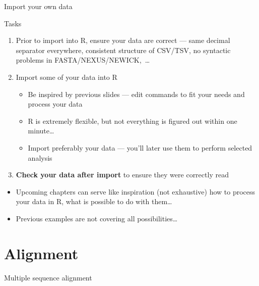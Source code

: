 \documentclass[compress, ucs, xelatex, 11pt, xcolor=svgnames, aspectratio=169,
	hyperref={
		bookmarks=true,
		unicode=true,
		colorlinks=true,
		pdftitle={Molecular data in R},
		plainpages=false,
		pdfauthor={Vojtech Zeisek},
		pdfsubject={Course about phylogeny and evolution in R},
		pdfcreator={XeLaTeX},
		pdfkeywords={R, evolution, phylogeny, molecular data},
		linkcolor=Crimson, %
		anchorcolor=Magenta, %
		citecolor=Magenta, %
		filecolor=Magenta, %
		menucolor=Magenta, %
		urlcolor=DodgerBlue, %
		pdftex},
	url={hyphens, lowtilde} %
	]{beamer}
\begin{document}
\begin{frame}{Import your own data}
	\begin{exampleblock}{Tasks}
		\begin{enumerate}
			\item Prior to import into R, \alert{ensure your data are correct} --- same decimal separator everywhere, consistent structure of CSV/TSV, no syntactic problems in FASTA/NEXUS/NEWICK,~\ldots
			\item Import some of your data into R
			\begin{itemize}
				\item Be inspired by previous slides --- edit commands to fit your needs and process your data
				\item R is extremely flexible, but not everything is figured out within one minute\ldots
				\item Import preferably your data --- you'll later use them to perform selected analysis
			\end{itemize}
			\item \textbf{Check your data after import} to ensure they were correctly read
		\end{enumerate}
	\end{exampleblock}
	\begin{itemize}
		\item Upcoming chapters can serve like inspiration (not exhaustive) how to process your data in R, what is possible to do with them\ldots
		\item Previous examples are not covering all possibilities\ldots
	\end{itemize}
\end{frame}

\section{Alignment}

\begin{frame}[fragile]{Multiple sequence alignment}
	\tableofcontents[currentsection, sectionstyle=show/hide, hideothersubsections]
\end{frame}
\end{document}
